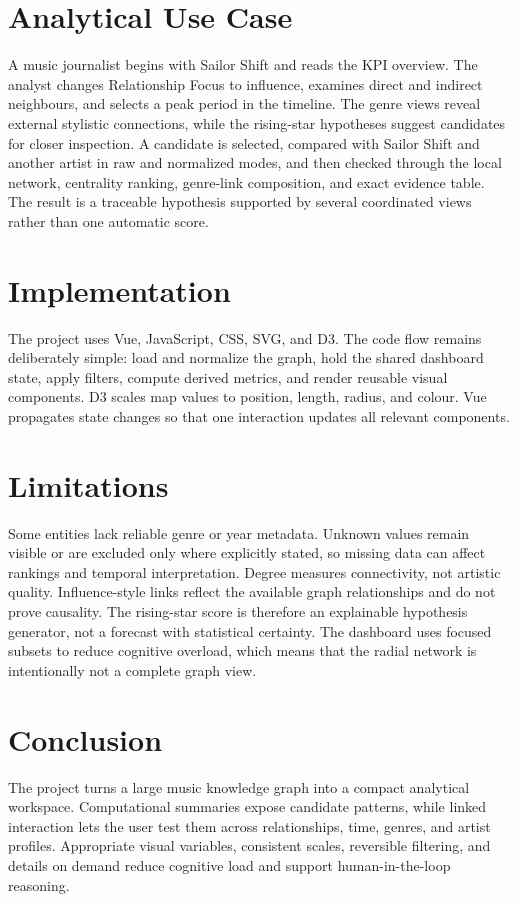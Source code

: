 \documentclass[9pt,a4paper]{article}
\begin{document}
\section{Analytical Use Case}
A music journalist begins with Sailor Shift and reads the KPI overview. The analyst changes Relationship Focus to influence, examines direct and indirect neighbours, and selects a peak period in the timeline. The genre views reveal external stylistic connections, while the rising-star hypotheses suggest candidates for closer inspection. A candidate is selected, compared with Sailor Shift and another artist in raw and normalized modes, and then checked through the local network, centrality ranking, genre-link composition, and exact evidence table. The result is a traceable hypothesis supported by several coordinated views rather than one automatic score.

\section{Implementation}
The project uses Vue, JavaScript, CSS, SVG, and D3. The code flow remains deliberately simple: load and normalize the graph, hold the shared dashboard state, apply filters, compute derived metrics, and render reusable visual components. D3 scales map values to position, length, radius, and colour. Vue propagates state changes so that one interaction updates all relevant components.

\section{Limitations}
Some entities lack reliable genre or year metadata. Unknown values remain visible or are excluded only where explicitly stated, so missing data can affect rankings and temporal interpretation. Degree measures connectivity, not artistic quality. Influence-style links reflect the available graph relationships and do not prove causality. The rising-star score is therefore an explainable hypothesis generator, not a forecast with statistical certainty. The dashboard uses focused subsets to reduce cognitive overload, which means that the radial network is intentionally not a complete graph view.

\section{Conclusion}
The project turns a large music knowledge graph into a compact analytical workspace. Computational summaries expose candidate patterns, while linked interaction lets the user test them across relationships, time, genres, and artist profiles. Appropriate visual variables, consistent scales, reversible filtering, and details on demand reduce cognitive load and support human-in-the-loop reasoning.
\end{document}
